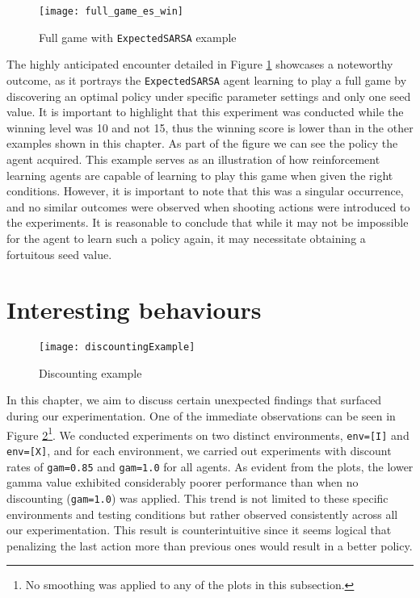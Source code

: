 \begin{figure}[h]
    \centering
    \texttt{[image: full\_game\_es\_win]}
    \caption{Full game with \texttt{ExpectedSARSA} example}
    \label{fig:full_game_es_eg}
\end{figure}

The highly anticipated encounter detailed in Figure \ref{fig:full_game_es_eg} showcases a noteworthy outcome, as it portrays the \texttt{ExpectedSARSA} agent learning to play a full game by discovering an optimal policy under specific parameter settings and only one seed value. It is important to highlight that this experiment was conducted while the winning level was 10 and not 15, thus the winning score is lower than in the other examples shown in this chapter. As part of the figure we can see the policy the agent acquired. This example serves as an illustration of how reinforcement learning agents are capable of learning to play this game when given the right conditions. However, it is important to note that this was a singular occurrence, and no similar outcomes were observed when shooting actions were introduced to the experiments. It is reasonable to conclude that while it may not be impossible for the agent to learn such a policy again, it may necessitate obtaining a fortuitous seed value.

\section{Interesting behaviours}
\label{intbeh}
\begin{figure}[h]
    \centering
    \texttt{[image: discountingExample]}
    \caption{Discounting example}
    \label{fig:discounting_eg}
\end{figure}

In this chapter, we aim to discuss certain unexpected findings that surfaced during our experimentation. One of the immediate observations can be seen in Figure \ref{fig:discounting_eg}\footnote{No smoothing was applied to any of the plots in this subsection.}. We conducted experiments on two distinct environments, \texttt{env=[I]} and \texttt{env=[X]}, and for each environment, we carried out experiments with discount rates of \texttt{gam=0.85} and \texttt{gam=1.0} for all agents. As evident from the plots, the lower gamma value exhibited considerably poorer performance than when no discounting (\texttt{gam=1.0}) was applied. This trend is not limited to these specific environments and testing conditions but rather observed consistently across all our experimentation. This result is counterintuitive since it seems logical that penalizing the last action more than previous ones would result in a better policy.

